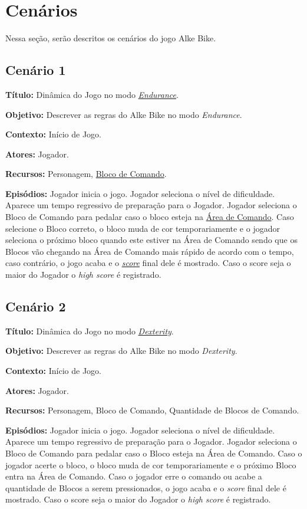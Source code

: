 \section{Cenários}

Nessa seção, serão descritos os \hypertarget{cenarios}{cenários} do jogo Alke Bike.

\subsection{Cenário 1}

\textbf{Título:} Dinâmica do Jogo no modo \hyperlink{endurance}{\textit{Endurance}}.

\textbf{Objetivo:} Descrever as regras do Alke Bike no modo \textit{Endurance}.

\textbf{Contexto:} Início de Jogo.

\textbf{Atores:} Jogador.

\textbf{Recursos:} Personagem, \hyperlink{blocoDeComando}{Bloco de Comando}.

\textbf{Episódios:} Jogador inicia o jogo. Jogador seleciona o nível de dificuldade. Aparece um tempo regressivo de preparação para o Jogador. Jogador seleciona o Bloco de Comando para pedalar caso o bloco esteja na \hyperlink{areaDeComando}{Área de Comando}. Caso selecione o Bloco correto, o bloco muda de cor temporariamente e o jogador seleciona o próximo bloco quando este estiver na Área de Comando sendo que os Blocos vão chegando na Área de Comando mais rápido de acordo com o tempo, caso contrário, o jogo acaba e o \hyperlink{score}{\textit{score}} final dele é mostrado. Caso o score seja o maior do Jogador o \textit{high score} é registrado.

\subsection{Cenário 2}

\textbf{Título:} Dinâmica do Jogo no modo \hyperlink{dexterity}{\textit{Dexterity}}.

\textbf{Objetivo:} Descrever as regras do Alke Bike no modo \textit{Dexterity}.

\textbf{Contexto:} Início de Jogo.

\textbf{Atores:} Jogador.

\textbf{Recursos:} Personagem, Bloco de Comando, Quantidade de Blocos de Comando.

\textbf{Episódios:} Jogador inicia o jogo. Jogador seleciona o nível de dificuldade. Aparece um tempo regressivo de preparação para o Jogador. Jogador seleciona o Bloco de Comando para pedalar caso o Bloco esteja na Área de Comando. Caso o jogador acerte o bloco, o bloco muda de cor temporariamente e o próximo Bloco entra na Área de Comando. Caso o jogador erre o comando ou acabe a quantidade de Blocos a serem pressionados, o jogo acaba e o \textit{score} final dele é mostrado. Caso o score seja o maior do Jogador o \textit{high score} é registrado.

